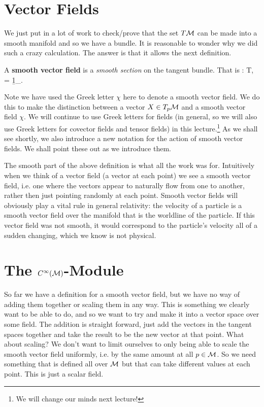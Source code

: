 \section{Vector Fields}

We just put in a lot of work to check/prove that the set $T\mathcal{M}$ can be made into a smooth manifold and so we have a bundle. It is reasonable to wonder why we did such a crazy calculation. The answer is that it allows the next definition. 

    A \textbf{smooth vector field} is a \textit{smooth section} on the tangent bundle. That is 
    \bse 
        \chi : \cM\to T\cM, \qquad \pi\circ \chi = \b1_{\cM}.
    \ese 
\ed 

\br 
    Note we have used the Greek letter $\chi$ here to denote a smooth vector field. We do this to make the distinction between a vector $X\in T_p\mathcal{M}$ and a smooth vector field $\chi$. We will continue to use Greek letters for fields (in general, so we will also use Greek letters for covector fields and tensor fields) in this lecture.\footnote{We will change our minds next lecture!} As we shall see shortly, we also introduce a new notation for the action of smooth vector fields. We shall point these out as we introduce them. 
\er 

The smooth part of the above definition is what all the work was for. Intuitively when we think of a vector field (a vector at each point) we see a smooth vector field, i.e. one where the vectors appear to naturally flow from one to another, rather then just pointing randomly at each point. Smooth vector fields will obviously play a vital rule in general relativity: the velocity of a particle is a smooth vector field over the manifold that is the worldline of the particle. If this vector field was not smooth, it would correspond to the particle's velocity all of a sudden changing, which we know is not physical.

\section{\texorpdfstring{The $C^{\infty}(\mathcal{M})$-Module}{The C-infinity(M)-Module}}

So far we have a definition for a smooth vector field, but we have no way of adding them together or scaling them in any way. This is something we clearly want to be able to do, and so we want to try and make it into a vector space over some field. The addition is straight forward, just add the vectors in the tangent spaces together and take the result to be the new vector at that point. What about scaling? We don't want to limit ourselves to only being able to scale the smooth vector field uniformly, i.e. by the same amount at all $p\in\mathcal{M}$. So we need something that is defined all over $\mathcal{M}$ but that can take different values at each point. This is just a scalar field. 

